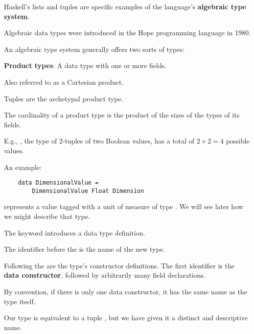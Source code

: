 \begin{notelist}
\item Haskell's lists and tuples are specific examples of the language's \textbf{algebraic type system}.
\item Algebraic data types were introduced in the Hope programming language in 1980. \cite{hope}
\item An algebraic type system generally offers two sorts of types:
\begin{notelist}
    \item \textbf{Product types}: A data type with one or more fields.
    \begin{notelist}
        \item Also referred to as a Cartesian product.
        \item Tuples are the archetypal product type.
        \item The cardinality of a product type is the product of the sizes of the types of its fields.
        \item E.g., , the type of 2-tuples of two Boolean values, has a total of $2 \times 2 = 4$ 
              possible values.
    \end{notelist}
    \item An example:
    \begin{lstlisting}
    data DimensionalValue =
        DimensionalValue Float Dimension
    \end{lstlisting}
    \begin{notelist}
        \item {} represents a  value tagged with a unit of measure
              of type . We will see later how we might describe that type.
        \item The  keyword introduces a data type definition.
        \item The identifier before the \code{=} is the name of the new type.
        \item Following the \code{=} are the type's constructor definitions. The first identifier is the
              \textbf{data constructor}, followed by arbitrarily many field declarations. 
        \item By convention, if there is only one data constructor, it has the same name as the type itself.
        \item Our  type is equivalent to a tuple ,
              but we have given it a distinct and descriptive name.
    \end{notelist}
    

\end{notelist}
\end{notelist}
